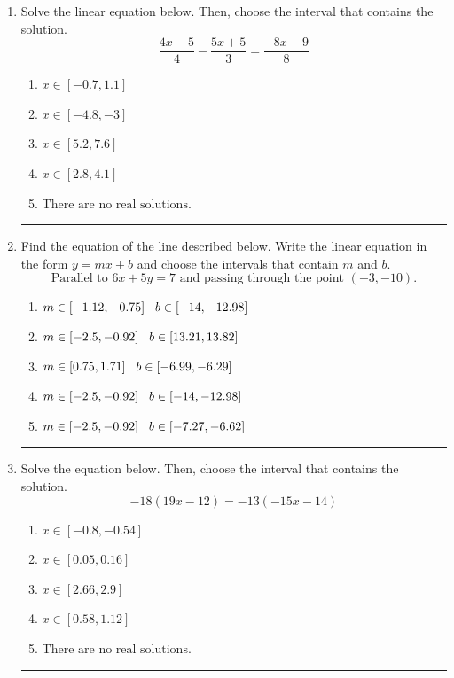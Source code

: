 \documentclass[14pt]{extbook}
\newcommand{\litem}[1]{\item#1\hspace*{-1cm}\rule{\textwidth}{0.4pt}}
\begin{document}
\begin{enumerate}
{\begin{enumerate}[label=\Alph*.]
\end{enumerate} }
\litem{
Solve the linear equation below. Then, choose the interval that contains the solution.\[ \frac{4x -5}{4} - \frac{5x + 5}{3} = \frac{-8x -9}{8} \]\begin{enumerate}[label=\Alph*.]
\item \( x \in [-0.7, 1.1] \)
\item \( x \in [-4.8, -3] \)
\item \( x \in [5.2, 7.6] \)
\item \( x \in [2.8, 4.1] \)
\item \( \text{There are no real solutions.} \)

\end{enumerate} }
\litem{
Find the equation of the line described below. Write the linear equation in the form $ y=mx+b $ and choose the intervals that contain $m$ and $b$.\[ \text{Parallel to } 6 x + 5 y = 7 \text{ and passing through the point } (-3, -10). \]\begin{enumerate}[label=\Alph*.]
\item \( m \in [-1.12, -0.75] \hspace*{3mm} b \in [-14, -12.98] \)
\item \( m \in [-2.5, -0.92] \hspace*{3mm} b \in [13.21, 13.82] \)
\item \( m \in [0.75, 1.71] \hspace*{3mm} b \in [-6.99, -6.29] \)
\item \( m \in [-2.5, -0.92] \hspace*{3mm} b \in [-14, -12.98] \)
\item \( m \in [-2.5, -0.92] \hspace*{3mm} b \in [-7.27, -6.62] \)

\end{enumerate} }
\litem{
Solve the equation below. Then, choose the interval that contains the solution.\[ -18(19x -12) = -13(-15x -14) \]\begin{enumerate}[label=\Alph*.]
\item \( x \in [-0.8, -0.54] \)
\item \( x \in [0.05, 0.16] \)
\item \( x \in [2.66, 2.9] \)
\item \( x \in [0.58, 1.12] \)
\item \( \text{There are no real solutions.} \)


\end{enumerate}}
\end{enumerate}
\end{document}
